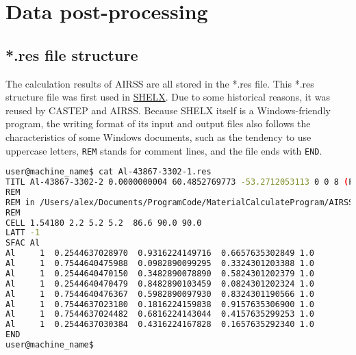 \documentclass[a4paper, 10pt]{article}
\begin{document}
\newpage
\section{Data post-processing}
\subsection{*.res file structure}

The calculation results of AIRSS are all stored in the *.res file. This *.res structure file was first used in \href{https://strucbio.biologie.uni-konstanz.de/ccp4wiki/index.php/SHELXL}{SHELX}. Due to some historical reasons, it was reused by CASTEP and AIRSS. Because SHELX itself is a Windows-friendly program, the writing format of its input and output files also follows the characteristics of some Windows documents, such as the tendency to use uppercase letters, \verb|REM| stands for comment lines, and the file ends with \verb|END|.

\begin{lstlisting}[language={bash}]
user@machine_name$ cat Al-43867-3302-1.res
TITL Al-43867-3302-2 0.0000000004 60.4852769773 -53.2712053113 0 0 8 (P63/mmc) n - 1
REM
REM in /Users/alex/Documents/ProgramCode/MaterialCalculateProgram/AIRSS/airss-0.9/examples/1.1
REM
CELL 1.54180 2.2 5.2 5.2  86.6 90.0 90.0
LATT -1
SFAC Al 
Al     1  0.2544637028970  0.9316224149716  0.6657635302849 1.0
Al     1  0.7544640475988  0.0982890099295  0.3324301203388 1.0
Al     1  0.2544640470150  0.3482890078890  0.5824301202379 1.0
Al     1  0.2544640470479  0.8482890103459  0.0824301202324 1.0
Al     1  0.7544640476367  0.5982890097930  0.8324301190566 1.0
Al     1  0.7544637023180  0.1816224159838  0.9157635306900 1.0
Al     1  0.7544637024482  0.6816224143044  0.4157635299253 1.0
Al     1  0.2544637030384  0.4316224167828  0.1657635292340 1.0
END
user@machine_name$
\end{lstlisting}
\end{document}
